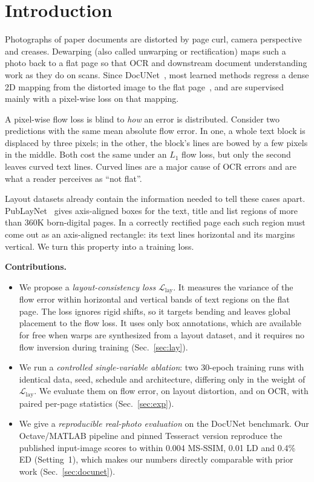 \documentclass[conference]{IEEEtran}
\newcommand{\Llay}{\mathcal{L}_{\mathrm{lay}}}
\begin{document}
\section{Introduction}
Photographs of paper documents are distorted by page curl, camera perspective and creases. Dewarping (also called unwarping or rectification) maps such a photo back to a flat page so that OCR and downstream document understanding work as they do on scans. Since DocUNet~\cite{ma2018docunet}, most learned methods regress a dense 2D mapping from the distorted image to the flat page~\cite{das2019dewarpnet,feng2021doctr,feng2022docgeonet,feng2024doctrpp,feng2025docscanner,verhoeven2023uvdoc}, and are supervised mainly with a pixel-wise loss on that mapping.

A pixel-wise flow loss is blind to \emph{how} an error is distributed. Consider two predictions with the same mean absolute flow error. In one, a whole text block is displaced by three pixels; in the other, the block's lines are bowed by a few pixels in the middle. Both cost the same under an $L_1$ flow loss, but only the second leaves curved text lines. Curved lines are a major cause of OCR errors and are what a reader perceives as ``not flat''.

Layout datasets already contain the information needed to tell these cases apart. PubLayNet~\cite{zhong2019publaynet} gives axis-aligned boxes for the text, title and list regions of more than 360K born-digital pages. In a correctly rectified page each such region must come out as an axis-aligned rectangle: its text lines horizontal and its margins vertical. We turn this property into a training loss.

\textbf{Contributions.}
\begin{itemize}
\item We propose a \emph{layout-consistency loss} $\Llay$. It measures the variance of the flow error within horizontal and vertical bands of text regions on the flat page. The loss ignores rigid shifts, so it targets bending and leaves global placement to the flow loss. It uses only box annotations, which are available for free when warps are synthesized from a layout dataset, and it requires no flow inversion during training (Sec.~\ref{sec:lay}).
\item We run a \emph{controlled single-variable ablation}: two 30-epoch training runs with identical data, seed, schedule and architecture, differing only in the weight of $\Llay$. We evaluate them on flow error, on layout distortion, and on OCR, with paired per-page statistics (Sec.~\ref{sec:exp}).
\item We give a \emph{reproducible real-photo evaluation} on the DocUNet benchmark. Our Octave/MATLAB pipeline and pinned Tesseract version reproduce the published input-image scores to within 0.004 MS-SSIM, 0.01 LD and 0.4\% ED (Setting~1), which makes our numbers directly comparable with prior work (Sec.~\ref{sec:docunet}).
\end{itemize}
\end{document}
